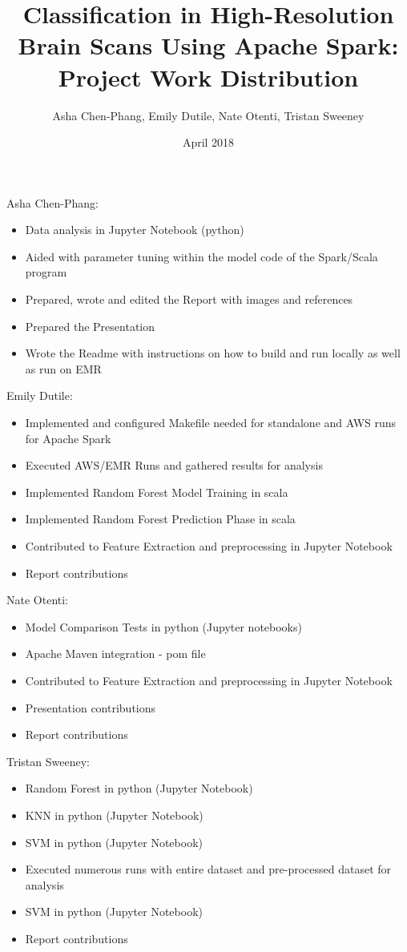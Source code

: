 \documentclass{neu_handout}
\title{Classification in High-Resolution Brain Scans Using Apache Spark: Project Work Distribution}
\author{Asha Chen-Phang, Emily Dutile, Nate Otenti, Tristan Sweeney}
\date{April 2018}
\begin{document}
\newenvironment{myitemize}
{ \begin{itemize}
    \setlength{\itemsep}{0pt}
    \setlength{\parskip}{0pt}
    \setlength{\parsep}{0pt}     }
{ \end{itemize}                  } 

Asha Chen-Phang:
\begin{myitemize}
  \item Data analysis in Jupyter Notebook (python)
   \item Aided with parameter tuning within the model code of the Spark/Scala program
  \item Prepared, wrote and edited the Report with images and references
  \item Prepared the Presentation
   \item Wrote the Readme with instructions on how to build and run locally as well as run on EMR
\end{myitemize}

Emily Dutile:
\begin{myitemize}
  \item Implemented and configured Makefile needed for standalone and AWS runs for Apache Spark
  \item Executed AWS/EMR Runs and gathered results for analysis
  \item Implemented Random Forest Model Training in scala
  \item Implemented Random Forest Prediction Phase in scala
\item Contributed to Feature Extraction and preprocessing in Jupyter Notebook
  \item Report contributions
\end{myitemize}

Nate Otenti:
\begin{myitemize}
  \item Model Comparison Tests in python (Jupyter notebooks)
   \item Apache Maven integration - pom file
    \item Contributed to Feature Extraction and preprocessing in Jupyter Notebook
   \item Presentation contributions
  \item Report contributions
\end{myitemize}

Tristan Sweeney:
\begin{myitemize}
  \item Random Forest in python (Jupyter Notebook)
  \item KNN in python (Jupyter Notebook)
  \item SVM in python (Jupyter Notebook)
  \item Executed numerous runs with entire dataset and pre-processed dataset for analysis
  \item SVM in python (Jupyter Notebook)
  \item Report contributions
\end{myitemize}
\end{document}
